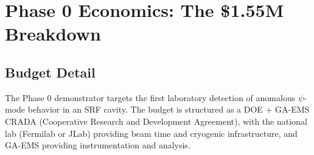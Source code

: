 \documentclass[11pt]{article}
\begin{document}
\section{Phase 0 Economics: The \$1.55M Breakdown}\label{sec:phase0}

\subsection{Budget Detail}

The Phase 0 demonstrator targets the first laboratory detection of
anomalous $\psi$-mode behavior in an SRF cavity. The budget is
structured as a DOE + GA-EMS CRADA (Cooperative Research and
Development Agreement), with the national lab (Fermilab or JLab)
providing beam time and cryogenic infrastructure, and GA-EMS
providing instrumentation and analysis.
\end{document}
